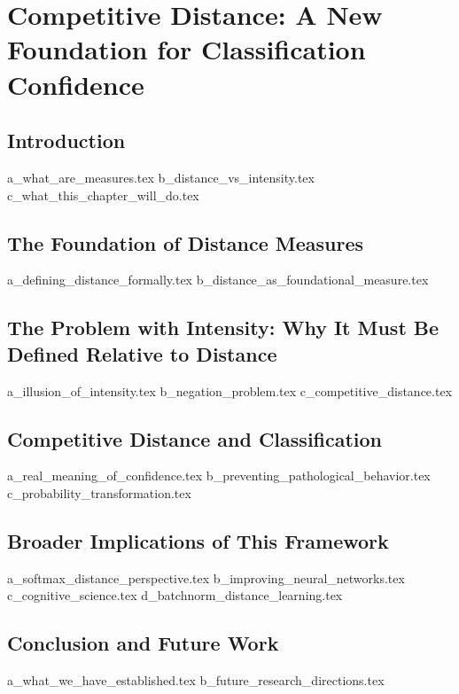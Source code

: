 \documentclass[12pt]{article}
\begin{document}
\chapter{Competitive Distance: A New Foundation for Classification Confidence}

\section{Introduction}
{a_what_are_measures.tex}
{b_distance_vs_intensity.tex}
{c_what_this_chapter_will_do.tex}

\section{The Foundation of Distance Measures}
{a_defining_distance_formally.tex}
{b_distance_as_foundational_measure.tex}

\section{The Problem with Intensity: Why It Must Be Defined Relative to Distance}
{a_illusion_of_intensity.tex}
{b_negation_problem.tex}
{c_competitive_distance.tex}

\section{Competitive Distance and Classification}
{a_real_meaning_of_confidence.tex}
{b_preventing_pathological_behavior.tex}
{c_probability_transformation.tex}

\section{Broader Implications of This Framework}
{a_softmax_distance_perspective.tex}
{b_improving_neural_networks.tex}
{c_cognitive_science.tex}
{d_batchnorm_distance_learning.tex}

\section{Conclusion and Future Work}
{a_what_we_have_established.tex}
{b_future_research_directions.tex}
\end{document}
